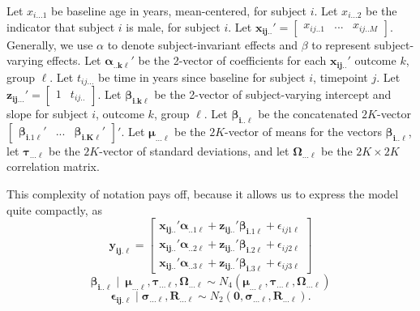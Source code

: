 \documentclass[12pt]{article}
\begin{document}
Let $x_{i...1}$ be baseline age in years, mean-centered, for subject $i$. Let $x_{i...2}$ be the indicator that subject $i$ is male, for subject $i$. Let $\boldsymbol{x_{ij..}'} = \begin{bmatrix}x_{ij..1} & ... & x_{ij..M}\end{bmatrix}.$ Generally, we use $\alpha$ to denote subject-invariant effects and $\beta$ to represent subject-varying effects. Let $\boldsymbol{\alpha_{..k\ell}'}$ be the 2-vector of coefficients for each $\boldsymbol{x_{ij..}'}$ outcome $k$, group $\ell$. Let $t_{ij...}$ be time in years since baseline for subject $i$, timepoint $j$. Let $\boldsymbol{z_{ij...}'} = \begin{bmatrix} 1 & t_{ij..} \end{bmatrix}$. Let $\boldsymbol{\beta_{i.k\ell}}$ be the 2-vector of subject-varying intercept and slope for subject $i$, outcome $k$, group $\ell$. Let $\boldsymbol{\beta_{i..\ell}}$ be the concatenated $2K$-vector $\begin{bmatrix} \boldsymbol{\beta_{i.1\ell}'} & ... & \boldsymbol{\beta_{i.K\ell}'} \end{bmatrix}'$. Let  $\boldsymbol{\mu_{...\ell}}$ be the $2K$-vector of means for the vectors $\boldsymbol{\beta_{i..\ell}}$, let $\boldsymbol{\tau_{...\ell}}$ be the $2K$-vector of standard deviations, and let $\boldsymbol{\Omega_{...\ell}}$ be the $2K \times 2K$ correlation matrix. 

This complexity of notation pays off, because it allows us to express the model quite compactly, as
$$
\boldsymbol{y_{ij.\ell}} = 
\begin{bmatrix}
	\boldsymbol{x_{ij..}'\alpha_{..1\ell} + z_{ij..}'\beta_{i.1\ell}} + \epsilon_{ij1\ell} \\
	\boldsymbol{x_{ij..}'\alpha_{..2\ell} + z_{ij..}'\beta_{i.2\ell}} + \epsilon_{ij2\ell} \\
	\boldsymbol{x_{ij..}'\alpha_{..3\ell} + z_{ij..}'\beta_{i.3\ell}} + \epsilon_{ij3\ell}	
\end{bmatrix}
$$
$$
\boldsymbol{\beta_{i..\ell}} \mid \ \boldsymbol{\mu_{...\ell}}, \boldsymbol{\tau_{...\ell}}, \boldsymbol{\Omega_{...\ell}}
\sim
N_4 \left(\boldsymbol{\mu_{...\ell}}, \boldsymbol{\tau_{...\ell}}, \boldsymbol{\Omega_{...\ell}}\right)  
$$
$$
\boldsymbol{\epsilon_{ij.\ell} \mid \sigma_{...\ell}, R_{...\ell}}
\sim 
N_2 \left(\boldsymbol{0, \sigma_{...\ell}, R_{...\ell}}\right).
$$
\end{document}
